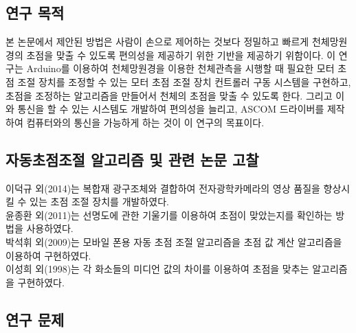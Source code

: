 
\subsection{연구 목적}

본 논문에서 제안된 방법은 사람이 손으로 제어하는 것보다 정밀하고 빠르게 천체망원경의 초점을 맞출 수 있도록 편의성을 제공하기 위한 기반을 제공하기 위함이다. 이 연구는 Arduino를 이용하여 천체망원경을 이용한 천체관측을 시행할 때 필요한 모터 초점 조절 장치를 조정할 수 있는 모터 초점 조절 장치 컨트롤러 구동 시스템을 구현하고, 초점을 조정하는 알고리즘을 만들어서 천체의 초점을 맞출 수 있도록 한다. 그리고 이와 통신을 할 수 있는 시스템도 개발하여 편의성을 늘리고, ASCOM 드라이버를 제작하여 컴퓨터와의 통신을 가능하게 하는 것이 이 연구의 목표이다.

\subsection{자동초점조절 알고리즘 및 관련 논문 고찰}

이덕규 외(2014)는 복합재 광구조체와 결합하여 전자광학카메라의 영상 품질을 향상시킬 수 있는 초점 조절 장치를 개발하였다.\cite{leedukgu2014}\\
윤종환 외(2011)는 선명도에 관한 기울기를 이용하여 초점이 맞았는지를 확인하는 방법을 사용하였다.\cite{yunjonghwan2011lcd}\\
박석휘 외(2009)는 모바일 폰용 자동 초점 조절 알고리즘을 초점 값 계산 알고리즘을 이용하여 구현하였다.\cite{parksukhui2009Median}\\
이성희 외(1998)는 각 화소들의 미디언 값의 차이를 이용하여 초점을 맞추는 알고리즘을 구현하였다.\cite{leeseonghee1998Median}

\subsection{연구 문제}